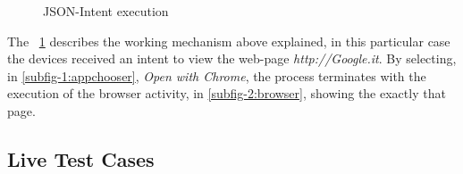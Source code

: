 \begin{figure}[h]
	\centering
	\begin{minipage}{.49\textwidth}\centering
	\end{minipage}
	\begin{minipage}{.49\textwidth}\centering
	\end{minipage}
	\caption{JSON-Intent execution}
	\label{fig:5.4}
\end{figure}
The \figurename~\ref{fig:5.4} describes the working mechanism above explained, in this particular case the devices received an intent to view the web-page \textit{http://Google.it}. By selecting, in \ref{subfig-1:appchooser}, \textit{Open with Chrome}, the process terminates with the execution of the browser activity, in \ref{subfig-2:browser}, showing the exactly that page.

\subsection{Live Test Cases}